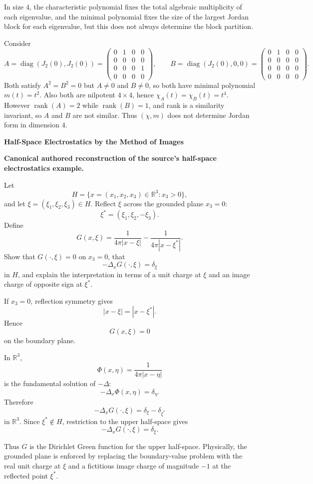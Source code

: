 \begin{solution}
In size $4$, the characteristic polynomial fixes the total algebraic multiplicity of each eigenvalue,
and the minimal polynomial fixes the size of the largest Jordan block for each eigenvalue, but this does not always determine the block partition.

Consider
\[
A=\operatorname{diag}(J_2(0),J_2(0))
=\begin{pmatrix}
	0&1&0&0\\
	0&0&0&0\\
	0&0&0&1\\
	0&0&0&0
\end{pmatrix},
\qquad
B=\operatorname{diag}(J_2(0),0,0)
=\begin{pmatrix}
	0&1&0&0\\
	0&0&0&0\\
	0&0&0&0\\
	0&0&0&0
\end{pmatrix}.
\]
Both satisfy $A^2=B^2=0$ but $A\neq 0$ and $B\neq 0$, so both have minimal polynomial $m(t)=t^2$.
Also both are nilpotent $4\times 4$, hence $\chi_A(t)=\chi_B(t)=t^4$.
However $\operatorname{rank}(A)=2$ while $\operatorname{rank}(B)=1$, and rank is a similarity invariant, so $A$ and $B$ are not similar.
Thus $(\chi,m)$ does not determine Jordan form in dimension $4$.
\end{solution}

\begin{problem}[CP-I-0096]
\label{prob:cp-i-0096}
\textbf{Half-Space Electrostatics by the Method of Images}

\textbf{Canonical authored reconstruction of the source's half-space electrostatics example.}

\hspace*{1.5em}Let
\[
H=\{x=(x_1,x_2,x_3)\in\mathbb R^3:x_3>0\},
\]
and let \(\xi=(\xi_1,\xi_2,\xi_3)\in H\). Reflect \(\xi\) across the grounded plane \(x_3=0\):
\[
\xi^\ast=(\xi_1,\xi_2,-\xi_3).
\]
Define
\[
G(x,\xi)
=
\frac{1}{4\pi|x-\xi|}
-
\frac{1}{4\pi|x-\xi^\ast|}.
\]
Show that \(G(\cdot,\xi)=0\) on \(x_3=0\), that
\[
-\Delta_x G(\cdot,\xi)=\delta_\xi
\]
in \(H\), and explain the interpretation in terms of a unit charge at \(\xi\) and an image charge
of opposite sign at \(\xi^\ast\).
\end{problem}

\begin{solution}
If \(x_3=0\), reflection symmetry gives
\[
|x-\xi|=|x-\xi^\ast|.
\]
Hence
\[
G(x,\xi)=0
\]
on the boundary plane.

In \(\mathbb R^3\),
\[
\Phi(x,\eta)=\frac{1}{4\pi|x-\eta|}
\]
is the fundamental solution of \(-\Delta\):
\[
-\Delta_x\Phi(x,\eta)=\delta_\eta.
\]
Therefore
\[
-\Delta_xG(\cdot,\xi)
=
\delta_\xi-\delta_{\xi^\ast}
\]
in \(\mathbb R^3\). Since \(\xi^\ast\notin H\), restriction to the upper half-space gives
\[
-\Delta_xG(\cdot,\xi)=\delta_\xi.
\]

Thus \(G\) is the Dirichlet Green function for the upper half-space. Physically, the grounded
plane is enforced by replacing the boundary-value problem with the real unit charge at \(\xi\)
and a fictitious image charge of magnitude \(-1\) at the reflected point \(\xi^\ast\).
\end{solution}

